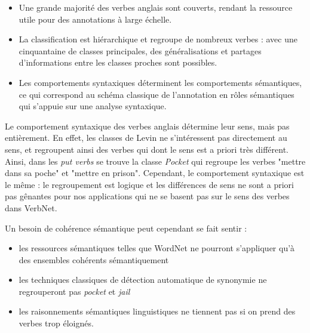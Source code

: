 \begin{itemize}

    \item Une grande majorité des verbes anglais sont couverts, rendant la
        ressource utile pour des annotations à large échelle.

    \item La classification est hiérarchique et regroupe de nombreux verbes :
        avec une cinquantaine de classes principales, des généralisations et
        partages d'informations entre les classes proches sont possibles.

    \item Les comportements syntaxiques déterminent les comportements
        sémantiques, ce qui correspond au schéma classique de l'annotation en
        rôles sémantiques qui s'appuie sur une analyse syntaxique.

\end{itemize}



Le comportement syntaxique des verbes anglais détermine leur sens, mais pas
entièrement. En effet, les classes de Levin ne s'intéressent pas directement au
sens, et regroupent ainsi des verbes qui dont le sens est a priori très
différent. Ainsi, dans les \textit{put verbs} se trouve la classe
\textit{Pocket} qui regroupe les verbes "mettre dans sa poche" et "mettre en
prison". Cependant, le comportement syntaxique est le même : le regroupement
est logique et les différences de sens ne sont a priori pas gênantes pour nos
applications qui ne se basent pas sur le sens des verbes dans VerbNet.

Un besoin de cohérence sémantique peut cependant se fait sentir :

\begin{itemize}

    \item les ressources sémantiques telles que WordNet ne pourront s'appliquer
        qu'à des ensembles cohérents sémantiquement

    \item les techniques classiques de détection automatique de synonymie ne
        regrouperont pas \textit{pocket} et \textit{jail}

    \item les raisonnements sémantiques linguistiques ne tiennent pas si on
        prend des verbes trop éloignés.

\end{itemize}

